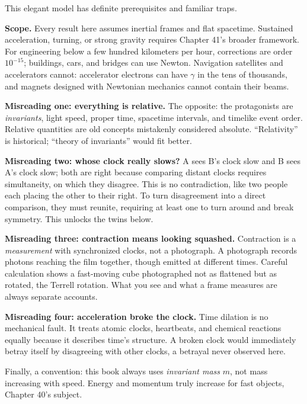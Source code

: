 
\begin{mainline}
This elegant model has definite prerequisites and familiar traps.

\textbf{Scope.} Every result here assumes inertial frames and flat spacetime. Sustained acceleration, turning, or strong gravity requires Chapter 41's broader framework. For engineering below a few hundred kilometers per hour, corrections are order \(10^{-15}\); buildings, cars, and bridges can use Newton. Navigation satellites and accelerators cannot: accelerator electrons can have \(\gamma\) in the tens of thousands, and magnets designed with Newtonian mechanics cannot contain their beams.

\textbf{Misreading one: everything is relative.} The opposite: the protagonists are \emph{invariants}, light speed, proper time, spacetime intervals, and timelike event order. Relative quantities are old concepts mistakenly considered absolute. ``Relativity'' is historical; ``theory of invariants'' would fit better.

\textbf{Misreading two: whose clock really slows?} A sees B's clock slow and B sees A's clock slow; both are right because comparing distant clocks requires simultaneity, on which they disagree. This is no contradiction, like two people each placing the other to their right. To turn disagreement into a direct comparison, they must reunite, requiring at least one to turn around and break symmetry. This unlocks the twins below.

\textbf{Misreading three: contraction means looking squashed.} Contraction is a \emph{measurement} with synchronized clocks, not a photograph. A photograph records photons reaching the film together, though emitted at different times. Careful calculation shows a fast-moving cube photographed not as flattened but as rotated, the Terrell rotation. What you see and what a frame measures are always separate accounts.

\textbf{Misreading four: acceleration broke the clock.} Time dilation is no mechanical fault. It treats atomic clocks, heartbeats, and chemical reactions equally because it describes time's structure. A broken clock would immediately betray itself by disagreeing with other clocks, a betrayal never observed here.

Finally, a convention: this book always uses \emph{invariant mass} \(m\), not mass increasing with speed. Energy and momentum truly increase for fast objects, Chapter 40's subject.
\end{mainline}

